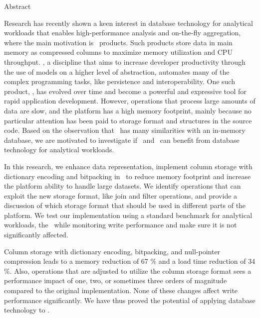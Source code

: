 {\Huge Abstract}
\vspace{1cm}

Research has recently shown a keen interest in database technology for analytical workloads that enables high-performance analysis and on-the-fly aggregation, where the main motivation is \bi~products. Such products store data in main memory as compressed columns to maximize memory utilization and CPU throughput. \mde, a discipline that aims to increase developer productivity through the use of models on a higher level of abstraction, automates many of the complex programming tasks, like persistence and interoperability. One such product, \gap, has evolved over time and become a powerful and expressive tool for rapid application development. However, operations that process large amounts of data are slow, and the platform has a high memory footprint, mainly because no particular attention has been paid to storage format and structures in the source code. Based on the observation that \gap~has many similarities with an in-memory database, we are motivated to investigate if \gap~and \mdd~can benefit from database technology for analytical workloads. 

In this research, we enhance data representation, implement column storage with dictionary encoding and bitpacking in \gap~to reduce memory footprint and increase the platform ability to handle large datasets. We identify operations that can exploit the new storage format, like join and filter operations, and provide a discussion of which storage format that should be used in different parts of the platform. We test our implementation using a standard benchmark for analytical workloads, the \tpch~while monitoring write performance and make sure it is not significantly affected. 

Column storage with dictionary encoding, bitpacking, and null-pointer compression leads to a memory reduction of 67 \% and a load time reduction of 34 \%. Also, operations that are adjusted to utilize the column storage format sees a performance impact of one, two, or sometimes three orders of magnitude compared to the original implementation. None of these changes affect write performance significantly. We have thus proved the potential of applying database technology to \mde.

